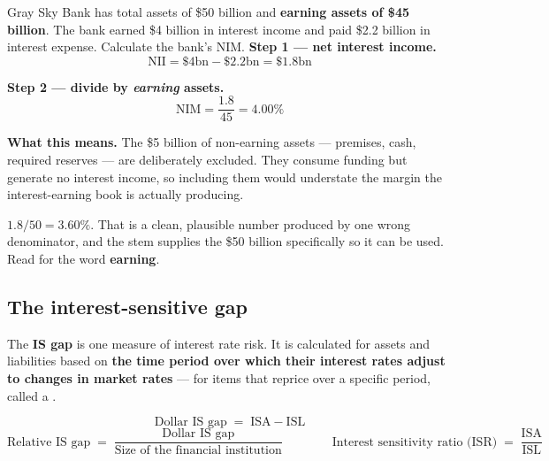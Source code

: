 \begin{lrexbox}
Gray Sky Bank has total assets of \$50 billion and \textbf{earning assets of \$45 billion}. The bank earned \$4 billion in interest income and paid \$2.2 billion in interest expense. Calculate the bank's NIM.
\tcblower
\textbf{Step 1 --- net interest income.}
\[ \text{NII} = \$4\text{bn} - \$2.2\text{bn} = \$1.8\text{bn} \]

\textbf{Step 2 --- divide by \emph{earning} assets.}
\[ \text{NIM} = \frac{1.8}{45} = \mathbf{4.00\%} \]

\textbf{What this means.} The \$5 billion of non-earning assets --- premises, cash, required reserves --- are deliberately excluded. They consume funding but generate no interest income, so including them would understate the margin the interest-earning book is actually producing.
\end{lrexbox}

\begin{lrtrapbox}
$1.8 / 50 = 3.60\%$. That is a clean, plausible number produced by one wrong denominator, and the stem supplies the \$50 billion specifically so it can be used. Read for the word \textbf{earning}.
\end{lrtrapbox}

\subsection{The interest-sensitive gap}

The \textbf{IS gap} is one measure of interest rate risk. It is calculated for assets and liabilities based on \textbf{the time period over which their interest rates adjust to changes in market rates} --- for items that reprice over a specific period, called a .

\begin{lrfmlbox}
\[ \text{Dollar IS gap} \;=\; \text{ISA} - \text{ISL} \]
\[ \text{Relative IS gap} \;=\; \frac{\text{Dollar IS gap}}{\text{Size of the financial institution}} \qquad\qquad
   \text{Interest sensitivity ratio (ISR)} \;=\; \frac{\text{ISA}}{\text{ISL}} \]
\end{lrfmlbox}

